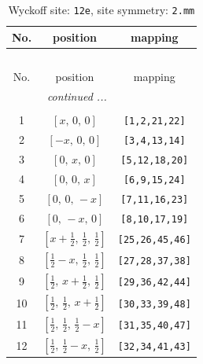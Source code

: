 \documentclass[fleqn,8pt]{jsarticle}
\begin{document}
\begin{longtable}{ccc}
\caption{Wyckoff site: {\tt 12e}, site symmetry: {\tt 2.mm}}
 \\
 \hline \hline
No. & position & mapping \\ \hline \endfirsthead

\multicolumn{2}{l}{\tablename\ \thetable{}} \\
 \hline \hline
No. & position & mapping \\ \hline \endhead

 \hline \hline
\multicolumn{2}{r}{\footnotesize\it continued ...} \\ \endfoot

 \hline \hline
\multicolumn{2}{r}{} \\ \endlastfoot

1 & $\left[ x,\, 0,\, 0 \right]$ & {\tt [1,2,21,22]} \\ \hline
2 & $\left[ - x,\, 0,\, 0 \right]$ & {\tt [3,4,13,14]} \\ \hline
3 & $\left[ 0,\, x,\, 0 \right]$ & {\tt [5,12,18,20]} \\ \hline
4 & $\left[ 0,\, 0,\, x \right]$ & {\tt [6,9,15,24]} \\ \hline
5 & $\left[ 0,\, 0,\, - x \right]$ & {\tt [7,11,16,23]} \\ \hline
6 & $\left[ 0,\, - x,\, 0 \right]$ & {\tt [8,10,17,19]} \\ \hline
7 & $\left[ x + \frac{1}{2},\, \frac{1}{2},\, \frac{1}{2} \right]$ & {\tt [25,26,45,46]} \\ \hline
8 & $\left[ \frac{1}{2} - x,\, \frac{1}{2},\, \frac{1}{2} \right]$ & {\tt [27,28,37,38]} \\ \hline
9 & $\left[ \frac{1}{2},\, x + \frac{1}{2},\, \frac{1}{2} \right]$ & {\tt [29,36,42,44]} \\ \hline
10 & $\left[ \frac{1}{2},\, \frac{1}{2},\, x + \frac{1}{2} \right]$ & {\tt [30,33,39,48]} \\ \hline
11 & $\left[ \frac{1}{2},\, \frac{1}{2},\, \frac{1}{2} - x \right]$ & {\tt [31,35,40,47]} \\ \hline
12 & $\left[ \frac{1}{2},\, \frac{1}{2} - x,\, \frac{1}{2} \right]$ & {\tt [32,34,41,43]} \\
\end{longtable}
\renewcommand{\arraystretch}{1.2}
\end{document}
